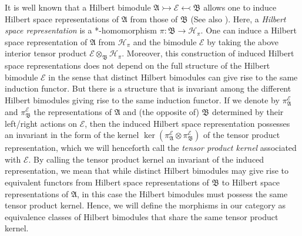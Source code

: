 \documentclass[sn-mathphys,Numbered]{sn-jnl}
\begin{document}
It is well known that a Hilbert bimodule $\mathfrak{A}\rightarrowtail\mathcal{E}\leftarrowtail\mathfrak{B}$ allows one to induce Hilbert space representations of $\mathfrak{A}$ from those of $\mathfrak{B}$ \citep{La95b} (See also \citep{Ri72a,Ri74,Ri74a,Gr78,Gr80,Ro94a}).  Here, a \emph{Hilbert space representation} is a *-homomorphism $\pi: \mathfrak{B}\to \mathcal{H}_\pi$.  One can induce a Hilbert space representation of $\mathfrak{A}$ from $\mathcal{H}_\pi$ and the bimodule $\mathcal{E}$ by taking the above interior tensor product $\mathcal{E}\otimes_\mathfrak{B}\mathcal{H}_\pi$.  Moreover, this construction of induced Hilbert space representations does not depend on the full structure of the Hilbert bimodule $\mathcal{E}$ in the sense that distinct Hilbert bimodules can give rise to the same induction functor.  But there is a structure that is invariant among the different Hilbert bimodules giving rise to the same induction functor.  If we denote by $\pi_\mathfrak{A}^\mathcal{E}$ and $\pi_\mathfrak{B}^\mathcal{E}$ the representations of $\mathfrak{A}$ and (the opposite of) $\mathfrak{B}$ determined by their left/right actions on $\mathcal{E}$, then the induced Hilbert space representation possesses an invariant in the form of the kernel $\ker(\pi_\mathfrak{A}^\mathcal{E}\otimes\pi_\mathfrak{B}^\mathcal{E})$ of the tensor product representation, which we will henceforth call the \emph{tensor product kernel} associated with $\mathcal{E}$.  By calling the tensor product kernel an invariant of the induced representation, we mean that while distinct Hilbert bimodules may give rise to equivalent functors from Hilbert space representations of $\mathfrak{B}$ to Hilbert space representations of $\mathfrak{A}$, in this case the Hilbert bimodules must possess the same tensor product kernel.  Hence, we will define the morphisms in our category as equivalence classes of Hilbert bimodules that share the same tensor product kernel.
\end{document}
